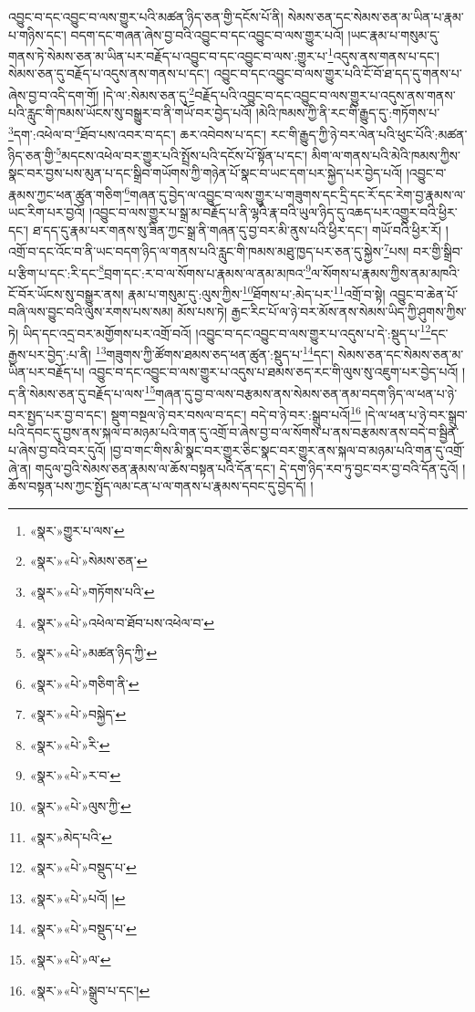 འབྱུང་བ་དང་འབྱུང་བ་ལས་གྱུར་པའི་མཚན་ཉིད་ཅན་གྱི་དངོས་པོ་ནི། སེམས་ཅན་དང་སེམས་ཅན་མ་ཡིན་པ་རྣམ་པ་གཉིས་དང་། བདག་དང་གཞན་ཞེས་བྱ་བའི་འབྱུང་བ་དང་འབྱུང་བ་ལས་གྱུར་པའོ། །ཡང་རྣམ་པ་གསུམ་དུ་གནས་ཏེ་སེམས་ཅན་མ་ཡིན་པར་བརྗོད་པ་འབྱུང་བ་དང་འབྱུང་བ་ལས་:གྱུར་པ་\footnote{«སྣར་»གྱུར་པ་ལས་}འདུས་ནས་གནས་པ་དང་། སེམས་ཅན་དུ་བརྗོད་པ་འདུས་ནས་གནས་པ་དང་། འབྱུང་བ་དང་འབྱུང་བ་ལས་གྱུར་པའི་ངོ་བོ་ཐ་དད་དུ་གནས་པ་ཞེས་བྱ་བ་འདི་དག་གོ། །དེ་ལ་:སེམས་ཅན་དུ་\footnote{«སྣར་»«པེ་»སེམས་ཅན་}བརྗོད་པའི་འབྱུང་བ་དང་འབྱུང་བ་ལས་གྱུར་པ་འདུས་ནས་གནས་པའི་རླུང་གི་ཁམས་ཡོངས་སུ་བསྒྱུར་བ་ནི་གཡོ་བར་བྱེད་པའོ། །མེའི་ཁམས་ཀྱི་ནི་རང་གི་རྒྱུད་དུ་:གཏོགས་པ་\footnote{«སྣར་»«པེ་»གཏོགས་པའི་}དག་:འཕེལ་བ་\footnote{«སྣར་»«པེ་»འཕེལ་བ་ཐོབ་པས་འཕེལ་བ་}ཐོབ་པས་འབར་བ་དང་། ཆར་འབེབས་པ་དང་། རང་གི་རྒྱུད་ཀྱི་ཉེ་བར་ལེན་པའི་ཕུང་པོའི་:མཚན་ཉིད་ཅན་གྱི་\footnote{«སྣར་»«པེ་»མཚན་ཉིད་ཀྱི་}མདངས་འཕེལ་བར་གྱུར་པའི་སྤྲོས་པའི་དངོས་པོ་སྟོན་པ་དང་། མིག་ལ་གནས་པའི་མེའི་ཁམས་ཀྱིས་སྣང་བར་བྱས་པས་མུན་པ་དང་སྒྲིབ་གཡོགས་ཀྱི་གཉེན་པོ་སྣང་བ་ཡང་དག་པར་སྐྱེད་པར་བྱེད་པའོ། །འབྱུང་བ་རྣམས་ཀྱང་ཕན་ཚུན་གཅིག་\footnote{«སྣར་»«པེ་»གཅིག་ནི་}གཞན་དུ་བྱེད་ལ་འབྱུང་བ་ལས་གྱུར་པ་གཟུགས་དང་དྲི་དང་རོ་དང་རེག་བྱ་རྣམས་ལ་ཡང་རིག་པར་བྱའོ། །འབྱུང་བ་ལས་གྱུར་པ་སྒྲ་མ་བརྗོད་པ་ནི་ལྷའི་རྣ་བའི་ཡུལ་ཉིད་དུ་འཆད་པར་འགྱུར་བའི་ཕྱིར་དང་། ཐ་དད་དུ་རྣམ་པར་གནས་སུ་ཟིན་ཀྱང་སྒྲ་ནི་གཞན་དུ་བྱ་བར་མི་ནུས་པའི་ཕྱིར་དང་། གཡོ་བའི་ཕྱིར་རོ། །འགྲོ་བ་དང་འོང་བ་ནི་ཡང་བདག་ཉིད་ལ་གནས་པའི་རླུང་གི་ཁམས་མཐུ་ཁྱད་པར་ཅན་དུ་སྐྱེས་\footnote{«སྣར་»«པེ་»བསྐྱེད་}པས། བར་གྱི་སྒྲིབ་པ་རྩིག་པ་དང་:རི་དང་\footnote{«སྣར་»«པེ་»རི་}བྲག་དང་:ར་བ་ལ་སོགས་པ་རྣམས་ལ་ནམ་མཁའ་\footnote{«སྣར་»«པེ་»ར་བ་}ལ་སོགས་པ་རྣམས་ཀྱིས་ནམ་མཁའི་ངོ་བོར་ཡོངས་སུ་བསྒྱུར་ནས། རྣམ་པ་གསུམ་དུ་:ལུས་ཀྱིས་\footnote{«སྣར་»«པེ་»ལུས་ཀྱི་}ཐོགས་པ་:མེད་པར་\footnote{«སྣར་»མེད་པའི་}འགྲོ་བ་སྟེ། འབྱུང་བ་ཆེན་པོ་བཞི་ལས་བྱུང་བའི་ལུས་རགས་པས་སམ། མོས་པས་ཏེ། རྒྱང་རིང་པོ་ལ་ཉེ་བར་མོས་ནས་སེམས་ཡིད་ཀྱི་ཤུགས་ཀྱིས་ཏེ། ཡིད་དང་འདྲ་བར་མགྱོགས་པར་འགྲོ་བའོ། །འབྱུང་བ་དང་འབྱུང་བ་ལས་གྱུར་པ་འདུས་པ་དེ་:སྡུད་པ་\footnote{«སྣར་»«པེ་»བསྡུད་པ་}དང་རྒྱས་པར་བྱེད་:པ་ནི། \footnote{«སྣར་»«པེ་»པའོ། ། }གཟུགས་ཀྱི་ཚོགས་ཐམས་ཅད་ཕན་ཚུན་:སྡུད་པ་\footnote{«སྣར་»«པེ་»བསྡུད་པ་}དང་། སེམས་ཅན་དང་སེམས་ཅན་མ་ཡིན་པར་བརྗོད་པ། འབྱུང་བ་དང་འབྱུང་བ་ལས་གྱུར་པ་འདུས་པ་ཐམས་ཅད་རང་གི་ལུས་སུ་འཇུག་པར་བྱེད་པའོ། །ད་ནི་སེམས་ཅན་དུ་བརྗོད་པ་ལས་\footnote{«སྣར་»«པེ་»ལ་}གཞན་དུ་བྱ་བ་ལས་བརྩམས་ནས་སེམས་ཅན་ནམ་བདག་ཉིད་ལ་ཕན་པ་ཉེ་བར་སྤྱད་པར་བྱ་བ་དང་། སྡུག་བསྔལ་ཉེ་བར་བསལ་བ་དང་། བདེ་བ་ཉེ་བར་:སྒྲུབ་པའོ།\footnote{«སྣར་»«པེ་»སྒྲུབ་པ་དང་།} །དེ་ལ་ཕན་པ་ཉེ་བར་སྒྲུབ་པའི་དབང་དུ་བྱས་ནས་སྐལ་བ་མཉམ་པའི་གན་དུ་འགྲོ་བ་ཞེས་བྱ་བ་ལ་སོགས་པ་ནས་བརྩམས་ནས་བདེ་བ་སྦྱིན་པ་ཞེས་བྱ་བའི་བར་དུའོ། །བྱ་བ་གང་གིས་མི་སྣང་བར་གྱུར་ཅིང་སྣང་བར་གྱུར་ནས་སྐལ་བ་མཉམ་པའི་གན་དུ་འགྲོ་ཞེ་ན། གདུལ་བྱའི་སེམས་ཅན་རྣམས་ལ་ཆོས་བསྟན་པའི་དོན་དང་། དེ་དག་ཉིད་རབ་ཏུ་བྱང་བར་བྱ་བའི་དོན་དུའོ། །ཆོས་བསྟན་པས་ཀྱང་སྤྱོད་ལམ་ངན་པ་ལ་གནས་པ་རྣམས་དབང་དུ་བྱེད་དོ། །
